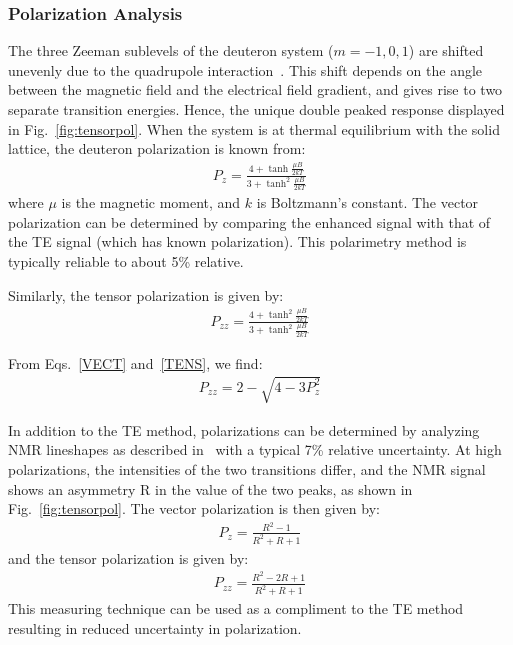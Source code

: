 \subsubsection{Polarization Analysis} 
The three Zeeman sublevels of the deuteron system ($m=-1,0,1$) are
shifted unevenly due to the quadrupole interaction~\cite{Meyer:1985dta}. This shift
depends on the angle between the magnetic field and the electrical field gradient, and gives rise to two separate transition
energies. Hence, the unique double peaked response displayed in Fig.~\ref{fig:tensorpol}.
When the system is at thermal equilibrium with the solid lattice, the deuteron polarization is known from:
\begin{eqnarray}
\label{VECT}
P_z = \frac{4+\tanh\frac{\mu B}{2 k T}} {3+\tanh^2\frac{\mu B}{2 k T}    }
\end{eqnarray}
where $\mu$ is the magnetic moment, and $k$ is Boltzmann's constant.  The vector polarization can be determined by comparing
the enhanced signal with that of the TE signal (which has known polarization).  This polarimetry method is typically reliable to about 5\% relative.

Similarly, the tensor polarization is given by: 
\begin{eqnarray}
\label{TENS}
P_{zz} = \frac{4+\tanh^2\frac{\mu B}{2 k T}} {3+\tanh^2\frac{\mu B}{2 k T}    }
\end{eqnarray}

From Eqs.~\ref{VECT} and~\ref{TENS}, we find:
\begin{eqnarray*}
\label{PZZEQN}
P_{zz}= 2 - \sqrt{4-3 P_z^2}
\end{eqnarray*}


In addition to the TE method, polarizations can be determined by analyzing NMR lineshapes as described in~\cite{Dulya:1997qc} with a typical  7\% relative uncertainty.  At high polarizations, the
intensities of the two transitions differ, and the NMR signal shows an asymmetry R in the
value of the two peaks, as shown in Fig.~\ref{fig:tensorpol}.  The vector polarization is then given by:
\begin{eqnarray}
\label{RVECT}
P_{z} = \frac{R^2-1}{R^2+R+1}
\end{eqnarray}
and the tensor polarization is given by:
\begin{eqnarray}
\label{TVECT}P_{zz} = \frac{R^2-2 R +1}{R^2+R+1}
\end{eqnarray}
This measuring technique can be used as a compliment to the TE method resulting in reduced uncertainty in polarization.


